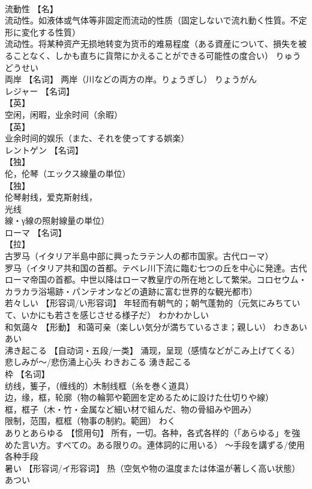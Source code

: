 \documentclass[8pt]{extreport}
\begin{document}
\begin{CJK}{UTF8}{min}
\\	流動性	【名】 
\\	流动性。如液体或气体等非固定而流动的性质（固定しないで流れ動く性質。不定形に変化する性質） 
\\	流动性。将某种资产无损地转变为货币的难易程度（ある資産について、損失を被ることなく、しかも直ちに貨幣にかえることができる可能性の度合い）	りゅうどうせい	
\\	両岸	【名词】 两岸（川などの両方の岸。りょうぎし）	りょうがん	
\\	レジャー	【名词】 
\\	【英】
\\	空闲，闲暇，业余时间（余暇） 
\\	【英】
\\	业余时间的娱乐（また、それを使ってする娯楽）		
\\	レントゲン	【名词】 
\\	【独】
\\	伦，伦琴（エックス線量の単位） 
\\	【独】
\\	伦琴射线，爱克斯射线，
\\	光线
\\	線・γ線の照射線量の単位）		
\\	ローマ	【名词】 
\\	【拉】
\\	古罗马（イタリア半島中部に興ったラテン人の都市国家。古代ローマ） 
\\	罗马（イタリア共和国の首都。テベレ川下流に臨む七つの丘を中心に発達。古代ローマ帝国の首都。中世以降はローマ教皇庁の所在地として繁栄。コロセウム・カラカラ浴場跡・パンテオンなどの遺跡に富む世界的な観光都市）		
\\	若々しい	【形容词/い形容词】 年轻而有朝气的；朝气蓬勃的（元気にみちていて、いかにも若さを感じさせる様子だ）	わかわかしい	
\\	和気藹々	【形動】 和蔼可亲（楽しい気分が満ちているさま；親しい）	わきあいあい	
\\	沸き起こる	【自动词・五段/一类】 涌现，呈现（感情などがこみ上げてくる） 悲しみが～/悲伤涌上心头	わきおこる	湧き起こる
\\	枠	【名词】 
\\	纺线，篗子，（缠线的）木制线框（糸を巻く道具） 
\\	边，缘，框，轮廓（物の輪郭や範囲を定めるために設けた仕切りや線） 
\\	框，框子（木・竹・金属など細い材で組んだ、物の骨組みや囲み） 
\\	限制，范围，框框（物事の制約。範囲）	わく	
\\	ありとあらゆる	【惯用句】 所有，一切。各种，各式各样的（「あらゆる」を強めた言い方。すべての。ある限りの。連体詞的に用いる） ～手段を講ずる/使用各种手段		
\\	暑い	【形容词/イ形容词】 热（空気や物の温度または体温が著しく高い状態）	あつい	
\end{CJK}
\end{document}
